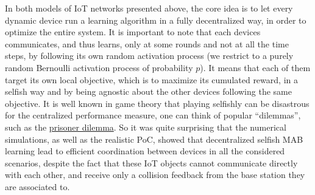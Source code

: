 %
In both models of IoT networks presented above, the core idea is to let every dynamic device run a learning algorithm in a fully decentralized way, in order to optimize the entire system.
It is important to note that each devices communicates, and thus learns, only at some rounds and not at all the time steps, by following its own random activation process (we restrict to a purely random Bernoulli activation process of probability $p$).
It means that each of them target its own local objective, which is to maximize its cumulated reward, in a selfish way and by being agnostic about the other devices following the same objective.
It is well known in game theory that playing selfishly can be disastrous for the centralized performance measure, one can think of popular ``dilemmas'', such as the \href{https://en.wikipedia.org/wiki/Prisoner%27s_dilemma}{prisoner dilemma}.
So it was quite surprising that the numerical simulations, as well as the realistic PoC, showed that decentralized selfish MAB learning lead to efficient coordination between devices in all the considered scenarios, despite the fact that these IoT objects cannot communicate directly with each other, and receive only a collision feedback from the base station they are associated to.

